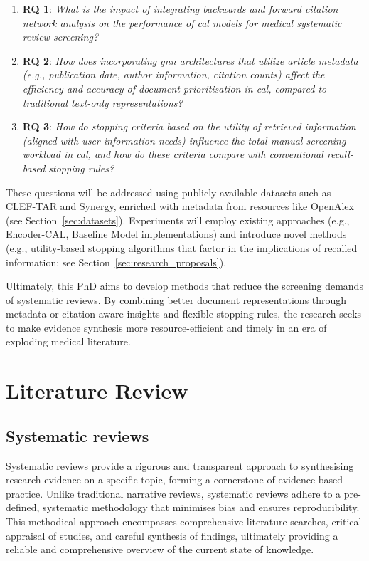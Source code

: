\documentclass[10pt,oneside]{book}
\begin{document}
\begin{enumerate} 

\item \textbf{RQ 1}: \emph{What is the impact of integrating backwards and forward citation network analysis on the performance of \gls*{cal} models for medical systematic review screening?}
\item \textbf{RQ 2}: \emph{How does incorporating \gls*{gnn} architectures that utilize article metadata (e.g., publication date, author information, citation counts) affect the efficiency and accuracy of document prioritisation in \gls*{cal}, compared to traditional text-only representations?}
\item \textbf{RQ 3}: \emph{How do stopping criteria based on the utility of retrieved information (aligned with user information needs) influence the total manual screening workload in \gls*{cal}, and how do these criteria compare with conventional recall-based stopping rules?}

\end{enumerate}

These questions will be addressed using publicly available datasets such as CLEF-TAR and Synergy, enriched with metadata from resources like OpenAlex (see Section~\ref{sec:datasets}). Experiments will employ existing approaches (e.g., Encoder-CAL, Baseline Model implementations) and introduce novel methods (e.g., utility-based stopping algorithms that factor in the implications of recalled information; see Section~\ref{sec:research_proposals}).

Ultimately, this PhD aims to develop methods that reduce the screening demands of systematic reviews. By combining better document representations through metadata or citation-aware insights and flexible stopping rules, the research seeks to make evidence synthesis more resource-efficient and timely in an era of exploding medical literature.

\chapter{Literature Review}

\section{Systematic reviews}

Systematic reviews provide a rigorous and transparent approach to synthesising research evidence on a specific topic, forming a cornerstone of evidence-based practice. Unlike traditional narrative reviews, systematic reviews adhere to a pre-defined, systematic methodology that minimises bias and ensures reproducibility. This methodical approach encompasses comprehensive literature searches, critical appraisal of studies, and careful synthesis of findings, ultimately providing a reliable and comprehensive overview of the current state of knowledge.
\end{document}

